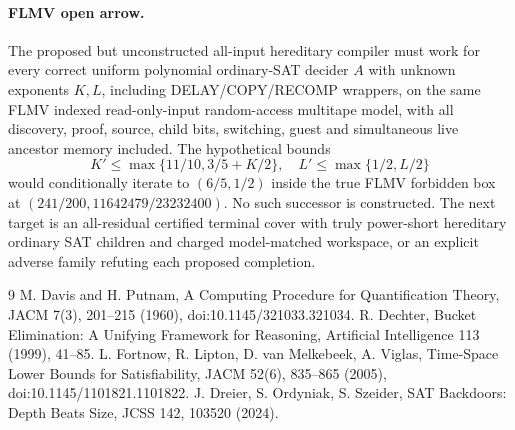 \documentclass[11pt]{article}
\begin{document}
\paragraph{FLMV open arrow.} The proposed but unconstructed all-input hereditary compiler must work for every correct uniform polynomial ordinary-SAT decider $A$ with unknown exponents $K,L$, including DELAY/COPY/RECOMP wrappers, on the same FLMV indexed read-only-input random-access multitape model, with all discovery, proof, source, child bits, switching, guest and simultaneous live ancestor memory included. The hypothetical bounds
\[
K'\le\max\{11/10,3/5+K/2\},\quad L'\le\max\{1/2,L/2\}
\]
would conditionally iterate to $(6/5,1/2)$ inside the true FLMV forbidden box at $(241/200,11642479/23232400)$. No such successor is constructed. The next target is an all-residual certified terminal cover with truly power-short hereditary ordinary SAT children and charged model-matched workspace, or an explicit adverse family refuting each proposed completion.
\begin{thebibliography}{9}
 M. Davis and H. Putnam, A Computing Procedure for Quantification Theory, JACM 7(3), 201--215 (1960), doi:10.1145/321033.321034.
 R. Dechter, Bucket Elimination: A Unifying Framework for Reasoning, Artificial Intelligence 113 (1999), 41--85.
 L. Fortnow, R. Lipton, D. van Melkebeek, A. Viglas, Time-Space Lower Bounds for Satisfiability, JACM 52(6), 835--865 (2005), doi:10.1145/1101821.1101822.
 J. Dreier, S. Ordyniak, S. Szeider, SAT Backdoors: Depth Beats Size, JCSS 142, 103520 (2024).
\end{thebibliography}
\end{document}
